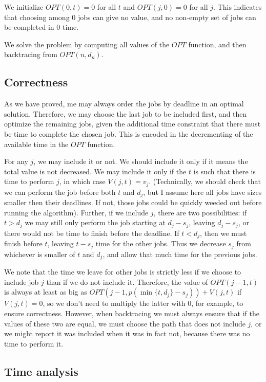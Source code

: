 \documentclass{article}
\begin{document}
We initialize $OPT(0, t) = 0$ for all $t$ and $OPT(j, 0) = 0$ for all $j$. This indicates that choosing among 0 jobs can give no value, and no non-empty set of jobs can be completed in 0 time.

We solve the problem by computing all values of the $OPT$ function, and then backtracing from $OPT(n, d_n)$.

\subsection{Correctness}

As we have proved, me may always order the jobs by deadline in an optimal solution. Therefore, we may choose the last job to be included first, and then optimize the remaining jobs, given the additional time constraint that there must be time to complete the chosen job. This is encoded in the decrementing of the available time in the $OPT$ function.

For any $j$, we may include it or not. We should include it only if it means the total value is not decreased. We may include it only if the $t$ is such that there is time to perform $j$, in which case $V(j,t) = v_j$. (Technically, we should check that we can perform the job before both $t$ and $d_j$, but I assume here all jobs have sizes smaller then their deadlines. If not, those jobs could be quickly weeded out before running the algorithm). Further, if we include $j$, there are two possibilities: if $t > d_j$ we may still only perform the job starting at $d_j - s_j$, leaving $d_j - s_j$, or there would not be time to finish before the deadline. If $t < d_j$, then we must finish before $t$, leaving $t - s_j$ time for the other jobs. Thus we decrease $s_j$ from whichever is smaller of $t$ and $d_j$, and allow that much time for the previous jobs.

We note that the time we leave for other jobs is strictly less if we choose to include job $j$ than if we do not include it. Therefore, the value of $OPT(j-1, t)$ is always at least as big as $OPT(j-1, p(\min\{t, d_j \} - s_j)) + V(j,t)$ if $V(j,t) = 0$, so we don't need to multiply the latter with 0, for example, to ensure correctness. However, when backtracing we must always ensure that if the values of these two are equal, we must choose the path that does not include $j$, or we might report it was included when it was in fact not, because there was no time to perform it.

\subsection{Time analysis}
\end{document}

